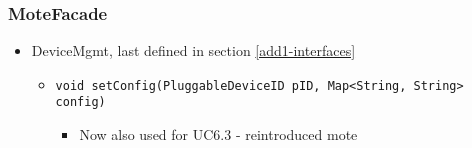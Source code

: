 {{{    \subsubsection{MoteFacade}
        \begin{itemize}
            \item DeviceMgmt, last defined in section \ref{add1-interfaces}
            \begin{itemize}
                \item \texttt{void setConfig(PluggableDeviceID pID, Map<String, String> config)}
                \begin{itemize}
                    \item Now also used for UC6.3 - reintroduced mote
                \end{itemize}
            \end{itemize}
        \end{itemize}

}}}
